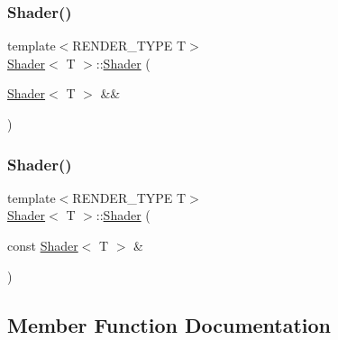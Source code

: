 \mbox{\label{classShader_a7e30078f161d1c9f48a7b3921c01f816}} 
\subsubsection{\texorpdfstring{Shader()}{Shader()}\hspace{0.1cm}{\footnotesize\ttfamily [2/3]}}
{\footnotesize\ttfamily template$<$R\+E\+N\+D\+E\+R\+\_\+\+T\+Y\+PE T$>$ \\
\mbox{\hyperlink{classShader}{Shader}}$<$ T $>$\+::\mbox{\hyperlink{classShader}{Shader}} (\begin{DoxyParamCaption}\item[{\mbox{\hyperlink{classShader}{Shader}}$<$ T $>$ \&\&}]{ }\end{DoxyParamCaption})\hspace{0.3cm}{\ttfamily [delete]}}

\mbox{\label{classShader_a49b2a448a00b5e1413c17501f8873cca}} 
\subsubsection{\texorpdfstring{Shader()}{Shader()}\hspace{0.1cm}{\footnotesize\ttfamily [3/3]}}
{\footnotesize\ttfamily template$<$R\+E\+N\+D\+E\+R\+\_\+\+T\+Y\+PE T$>$ \\
\mbox{\hyperlink{classShader}{Shader}}$<$ T $>$\+::\mbox{\hyperlink{classShader}{Shader}} (\begin{DoxyParamCaption}\item[{const \mbox{\hyperlink{classShader}{Shader}}$<$ T $>$ \&}]{ }\end{DoxyParamCaption})\hspace{0.3cm}{\ttfamily [delete]}}



\subsection{Member Function Documentation}
\mbox{\label{classShader_a1176d69a08aef6df3b7850104871a839}} 
